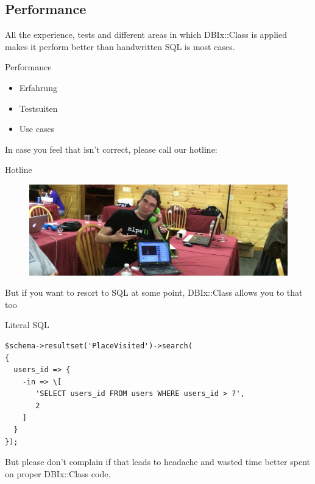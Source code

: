 \subsection{Performance}

All the experience, tests and different areas in which 
DBIx::Class is applied makes it perform better than
handwritten SQL is most cases.

\begin{frame}{Performance}
\begin{itemize}
\item Erfahrung
\item Testsuiten
\item Use cases
\end{itemize}
\end{frame}
 
In case you feel that isn't correct, please call our hotline:

\begin{frame}{Hotline}
\begin{figure}[!ht]
\centering
\includegraphics[width=1\linewidth]{img/perldance-2014-modern-tech.jpg}
\end{figure}
\end{frame}

But if you want to resort to SQL at some point, DBIx::Class allows you
to that too

\begin{frame}[fragile]{Literal SQL}
\begin{lstlisting}
$schema->resultset('PlaceVisited')->search(
{
  users_id => {
    -in => \[
       'SELECT users_id FROM users WHERE users_id > ?',
       2
    ]
  }
});
\end{lstlisting}
\end{frame}

But please don't complain if that leads to headache
and wasted time better spent on proper DBIx::Class
code.

